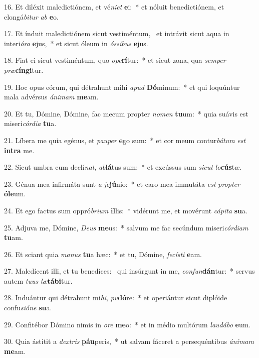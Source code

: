 16. Et diléxit maledictiónem, et vé\textit{ni}\textit{et} \textbf{e}i:~*  et nóluit benedictiónem, et elongá\textit{bi}\textit{tur} \textit{ab} \textbf{e}o.\

17. Et índuit maledictiónem sicut vestiméntum, \dag\  et intrávit sicut aqua in interi\textit{ó}\textit{ra} \textbf{e}jus,~*  et sicut óleum in \textit{ós}\textit{si}\textit{bus} \textbf{e}jus.\

18. Fiat ei sicut vestiméntum, quo \textit{o}\textit{pe}\textbf{rí}tur:~*  et sicut zona, qua \textit{sem}\textit{per} \textit{præ}\textbf{cín}\textbf{gi}tur.\

19. Hoc opus eórum, qui détrahunt mihi \textit{a}\textit{pud} \textbf{Dó}minum:~*  et qui loquúntur mala advérsus \textit{á}\textit{ni}\textit{mam} \textbf{me}am.\

20. Et tu, Dómine, Dómine, fac mecum propter \textit{no}\textit{men} \textbf{tu}um:~*  quia suávis est miseri\textit{cór}\textit{di}\textit{a} \textbf{tu}a.\

21. Líbera me quia egénus, et \textit{pau}\textit{per} \textbf{e}go sum:~*  et cor meum contur\textit{bá}\textit{tum} \textit{est} \textbf{in}\textbf{tra} me.\

22. Sicut umbra cum declí\textit{nat}, \textit{ab}\textbf{lá}tus sum:~*  et excússus sum \textit{sic}\textit{ut} \textit{lo}\textbf{cús}tæ.\

23. Génua mea infirmáta sunt \textit{a} \textit{je}\textbf{jú}nio:~*  et caro mea immutáta \textit{est} \textit{prop}\textit{ter} \textbf{ó}\textbf{le}um.\

24. Et ego factus sum oppró\textit{bri}\textit{um} \textbf{il}lis:~*  vidérunt me, et movérunt \textit{cá}\textit{pi}\textit{ta} \textbf{su}a.\

25. Adjuva me, Dómine, \textit{De}\textit{us} \textbf{me}us:~*  salvum me fac secúndum miseri\textit{cór}\textit{di}\textit{am} \textbf{tu}am.\

26. Et sciant quia \textit{ma}\textit{nus} \textbf{tu}a hæc:~*  et tu, Dómine, \textit{fe}\textit{cís}\textit{ti} \textbf{e}am.\

27. Maledícent illi, et tu benedíces: \dag\  qui insúrgunt in me, \textit{con}\textit{fun}\textbf{dán}tur:~*  servus autem \textit{tu}\textit{us} \textit{læ}\textbf{tá}\textbf{bi}tur.\

28. Induántur qui détrahunt mi\textit{hi}, \textit{pu}\textbf{dó}re:~*  et operiántur sicut diplóide confu\textit{si}\textit{ó}\textit{ne} \textbf{su}a.\

29. Confitébor Dómino nimis in \textit{o}\textit{re} \textbf{me}o:~*  et in médio multórum \textit{lau}\textit{dá}\textit{bo} \textbf{e}um.\

30. Quia ástitit a \textit{dex}\textit{tris} \textbf{páu}peris,~*  ut salvam fáceret a persequéntibus \textit{á}\textit{ni}\textit{mam} \textbf{me}am.\

